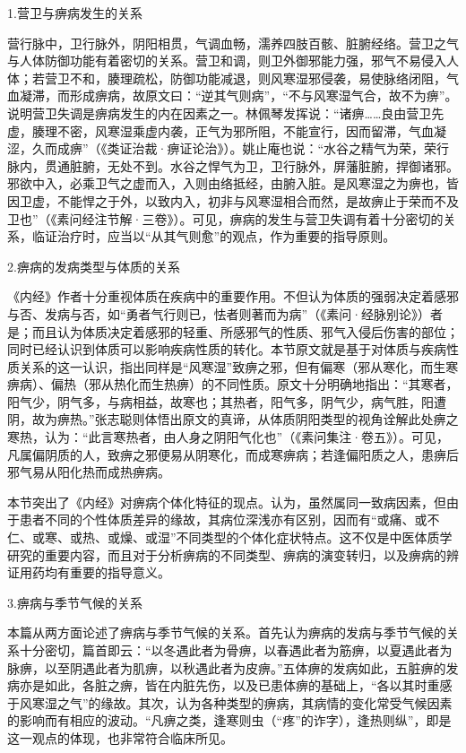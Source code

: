 \documentclass[draft,12pt]{ctexbook}
\begin{document}

1.营卫与痹病发生的关系

营行脉中，卫行脉外，阴阳相贯，气调血畅，濡养四肢百骸、脏腑经络。营卫之气与人体防御功能有着密切的关系。营卫和调，则卫外御邪能力强，邪气不易侵入人体；若营卫不和，腠理疏松，防御功能减退，则风寒湿邪侵袭，易使脉络闭阻，气血凝滞，而形成痹病，故原文曰：“逆其气则病”，“不与风寒湿气合，故不为痹”。说明营卫失调是痹病发生的内在因素之一。林佩琴发挥说：“诸痹……良由营卫先虚，腠理不密，风寒湿乘虚内袭，正气为邪所阻，不能宣行，因而留滞，气血凝涩，久而成痹”（《类证治裁·痹证论治》）。姚止庵也说：“水谷之精气为荣，荣行脉内，贯通脏腑，无处不到。水谷之悍气为卫，卫行脉外，屏藩脏腑，捍御诸邪。邪欲中入，必乘卫气之虚而入，入则由络抵经，由腑入脏。是风寒湿之为痹也，皆因卫虚，不能悍之于外，以致内入，初非与风寒湿相合而然，是故痹止于荣而不及卫也”（《素问经注节解·三卷》）。可见，痹病的发生与营卫失调有着十分密切的关系，临证治疗时，应当以“从其气则愈”的观点，作为重要的指导原则。

2.痹病的发病类型与体质的关系

《内经》作者十分重视体质在疾病中的重要作用。不但认为体质的强弱决定着感邪与否、发病与否，如“勇者气行则已，怯者则著而为病”（《素问·经脉别论》）者是；而且认为体质决定着感邪的轻重、所感邪气的性质、邪气入侵后伤害的部位；同时已经认识到体质可以影响疾病性质的转化。本节原文就是基于对体质与疾病性质关系的这一认识，指出同样是“风寒湿”致痹之邪，但有偏寒（邪从寒化，而生寒痹病）、偏热（邪从热化而生热痹）的不同性质。原文十分明确地指出：“其寒者，阳气少，阴气多，与病相益，故寒也；其热者，阳气多，阴气少，病气胜，阳遭阴，故为痹热。”张志聪则体悟出原文的真谛，从体质阴阳类型的视角诠解此处痹之寒热，认为：“此言寒热者，由人身之阴阳气化也”（《素问集注·卷五》）。可见，凡属偏阴质的人，致痹之邪便易从阴寒化，而成寒痹病；若逢偏阳质之人，患痹后邪气易从阳化热而成热痹病。

本节突出了《内经》对痹病个体化特征的现点。认为，虽然属同一致病因素，但由于患者不同的个性体质差异的缘故，其病位深浅亦有区别，因而有“或痛、或不仁、或寒、或热、或燥、或湿”不同类型的个体化症状特点。这不仅是中医体质学研究的重要内容，而且对于分析痹病的不同类型、痹病的演变转归，以及痹病的辨证用药均有重要的指导意义。

3.痹病与季节气候的关系

本篇从两方面论述了痹病与季节气候的关系。首先认为痹病的发病与季节气候的关系十分密切，篇首即云：“以冬遇此者为骨痹，以春遇此者为筋痹，以夏遇此者为脉痹，以至阴遇此者为肌痹，以秋遇此者为皮痹。”五体痹的发病如此，五脏痹的发病亦是如此，各脏之痹，皆在内脏先伤，以及已患体痹的基础上，“各以其时重感于风寒湿之气”的缘故。其次，认为各种类型的痹病，其病情的变化常受气候因素的影响而有相应的波动。“凡痹之类，逢寒则虫（“疼”的诈字），逢热则纵”，即是这一观点的体现，也非常符合临床所见。
\end{document}
